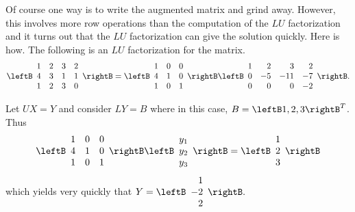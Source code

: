 \begin{solution}

Of course one way is to write the augmented matrix and grind away. However,
this involves more row operations than the computation of the $LU$
factorization and it turns out that the $LU$ factorization can give the
solution quickly. Here is how. The following is an $LU$ factorization for
the matrix. 
\begin{equation*}
\leftB 
\begin{array}{rrrr}
1 & 2 & 3 & 2 \\ 
4 & 3 & 1 & 1 \\ 
1 & 2 & 3 & 0
\end{array}
\rightB \allowbreak =\allowbreak \leftB 
\begin{array}{rrr}
1 & 0 & 0 \\ 
4 & 1 & 0 \\ 
1 & 0 & 1
\end{array}
\rightB \leftB 
\begin{array}{rrrr}
1 & 2 & 3 & 2 \\ 
0 & -5 & -11 & -7 \\ 
0 & 0 & 0 & -2
\end{array}
\rightB .
\end{equation*}

Let $UX=Y$ and consider $LY=B$ where in this case, $B=\leftB 1,2,3\rightB ^{T}$. Thus 
\begin{equation*}
\allowbreak \leftB 
\begin{array}{rrr}
1 & 0 & 0 \\ 
4 & 1 & 0 \\ 
1 & 0 & 1
\end{array}
\rightB \leftB 
\begin{array}{c}
y_{1} \\ 
y_{2} \\ 
y_{3}
\end{array}
\rightB =\leftB 
\begin{array}{c}
1 \\ 
2 \\ 
3
\end{array}
\rightB
\end{equation*}
which yields very quickly that $Y=\leftB 
\begin{array}{r}
1 \\ 
-2 \\ 
2
\end{array}
\rightB \allowbreak .$ 


\end{solution}
